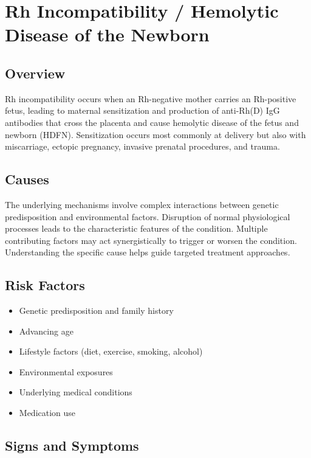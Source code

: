 \chapter{Rh Incompatibility / Hemolytic Disease of the Newborn}
\label{sec:Rh Incompatibility}

\section{Overview}
Rh incompatibility occurs when an Rh-negative mother carries an Rh-positive fetus, leading to maternal sensitization and production of anti-Rh(D) IgG antibodies that cross the placenta and cause hemolytic disease of the fetus and newborn (HDFN). Sensitization occurs most commonly at delivery but also with miscarriage, ectopic pregnancy, invasive prenatal procedures, and trauma.
\section{Causes}
The underlying mechanisms involve complex interactions between genetic predisposition and environmental factors. Disruption of normal physiological processes leads to the characteristic features of the condition. Multiple contributing factors may act synergistically to trigger or worsen the condition. Understanding the specific cause helps guide targeted treatment approaches.
\section{Risk Factors}


\begin{itemize}[noitemsep]
  \item Genetic predisposition and family history
  \item Advancing age
  \item Lifestyle factors (diet, exercise, smoking, alcohol)
  \item Environmental exposures
  \item Underlying medical conditions
  \item Medication use
\end{itemize}
\section{Signs and Symptoms}


